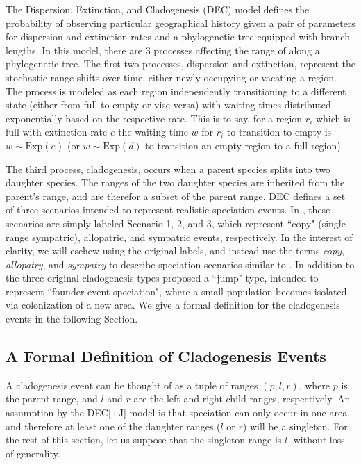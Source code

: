 \documentclass{article}
\begin{document}
The Dispersion, Extinction, and Cladogenesis (DEC) model defines the probability
of observing particular geographical history given a pair of parameters for
dispersion and extinction rates and a phylogenetic tree equipped with branch
lengths. 
In this model, there are 3 processes affecting the range of along a phylogenetic
tree.
The first two processes, dispersion and extinction, represent the stochastic
range shifts over time, either newly occupying or vacating a region.
The process is modeled as each region independently transitioning to a
different state (either from full to empty or vise versa) with waiting times
distributed exponentially based on the respective rate.
This is to say, for a region \( r_i \) which is full with extinction
rate \( e \) the waiting time \( w \) for \( r_i \) to transition to empty is \(
w \sim \text{Exp}(e) \) (or $w \sim \text{Exp}(d)$ to transition an empty region
to a full region).

The third process, cladogenesis, occurs when a parent species splits into two
daughter species.
The ranges of the two daughter species are inherited from the parent's range,
and are therefor a subset of the parent range.
DEC defines a set of three scenarios intended to represent realistic speciation
events.
In \citet{ALikelihoodFrReeR2005}, these scenarios are simply labeled Scenario 1,
2, and 3, which represent ``copy" (single-range sympatric), allopatric, and
sympatric events, respectively.
In the interest of clarity, we will eschew using the original labels, and
instead use the terms \textit{copy}, \textit{allopatry}, and \textit{sympatry}
to describe speciation scenarios similar to \citet{ModelSelectionMatzke2014}.
In addition to the three original cladogenesis types 
\citet{ModelSelectionMatzke2014} proposed a ``jump" type, intended to represent
``founder-event speciation", where a small population becomes isolated via
colonization of a new area.
We give a formal definition for the cladogenesis events in the following Section.

\subsection{A Formal Definition of Cladogenesis Events}
\label{sec:formal-cladogenesis}

A cladogenesis event can be thought of as a tuple of ranges $(p, l, r)$, where
$p$ is the parent range, and $l$ and $r$ are the left and right child ranges,
respectively. 
An assumption by the DEC[+J] model is that speciation can only occur in one
area, and therefore at least one of the daughter ranges ($l$ or $r$) will be a
singleton.
For the rest of this section, let us suppose that the singleton range is $l$,
without loss of generality.
\end{document}
